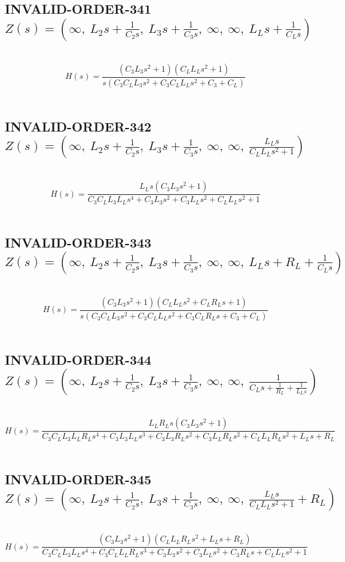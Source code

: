 \documentclass{article}
\begin{document}
\subsection{INVALID-ORDER-341 $Z(s) = \left( \infty, \  L_{2} s + \frac{1}{C_{2} s}, \  L_{3} s + \frac{1}{C_{3} s}, \  \infty, \  \infty, \  L_{L} s + \frac{1}{C_{L} s}\right)$ } \ 
\textbf{\[H(s) = \frac{\left(C_{3} L_{3} s^{2} + 1\right) \left(C_{L} L_{L} s^{2} + 1\right)}{s \left(C_{3} C_{L} L_{3} s^{2} + C_{3} C_{L} L_{L} s^{2} + C_{3} + C_{L}\right)}\] } \ 
\subsection{INVALID-ORDER-342 $Z(s) = \left( \infty, \  L_{2} s + \frac{1}{C_{2} s}, \  L_{3} s + \frac{1}{C_{3} s}, \  \infty, \  \infty, \  \frac{L_{L} s}{C_{L} L_{L} s^{2} + 1}\right)$ } \ 
\textbf{\[H(s) = \frac{L_{L} s \left(C_{3} L_{3} s^{2} + 1\right)}{C_{3} C_{L} L_{3} L_{L} s^{4} + C_{3} L_{3} s^{2} + C_{3} L_{L} s^{2} + C_{L} L_{L} s^{2} + 1}\] } \ 
\subsection{INVALID-ORDER-343 $Z(s) = \left( \infty, \  L_{2} s + \frac{1}{C_{2} s}, \  L_{3} s + \frac{1}{C_{3} s}, \  \infty, \  \infty, \  L_{L} s + R_{L} + \frac{1}{C_{L} s}\right)$ } \ 
\textbf{\[H(s) = \frac{\left(C_{3} L_{3} s^{2} + 1\right) \left(C_{L} L_{L} s^{2} + C_{L} R_{L} s + 1\right)}{s \left(C_{3} C_{L} L_{3} s^{2} + C_{3} C_{L} L_{L} s^{2} + C_{3} C_{L} R_{L} s + C_{3} + C_{L}\right)}\] } \ 
\subsection{INVALID-ORDER-344 $Z(s) = \left( \infty, \  L_{2} s + \frac{1}{C_{2} s}, \  L_{3} s + \frac{1}{C_{3} s}, \  \infty, \  \infty, \  \frac{1}{C_{L} s + \frac{1}{R_{L}} + \frac{1}{L_{L} s}}\right)$ } \ 
\textbf{\[H(s) = \frac{L_{L} R_{L} s \left(C_{3} L_{3} s^{2} + 1\right)}{C_{3} C_{L} L_{3} L_{L} R_{L} s^{4} + C_{3} L_{3} L_{L} s^{3} + C_{3} L_{3} R_{L} s^{2} + C_{3} L_{L} R_{L} s^{2} + C_{L} L_{L} R_{L} s^{2} + L_{L} s + R_{L}}\] } \ 
\subsection{INVALID-ORDER-345 $Z(s) = \left( \infty, \  L_{2} s + \frac{1}{C_{2} s}, \  L_{3} s + \frac{1}{C_{3} s}, \  \infty, \  \infty, \  \frac{L_{L} s}{C_{L} L_{L} s^{2} + 1} + R_{L}\right)$ } \ 
\textbf{\[H(s) = \frac{\left(C_{3} L_{3} s^{2} + 1\right) \left(C_{L} L_{L} R_{L} s^{2} + L_{L} s + R_{L}\right)}{C_{3} C_{L} L_{3} L_{L} s^{4} + C_{3} C_{L} L_{L} R_{L} s^{3} + C_{3} L_{3} s^{2} + C_{3} L_{L} s^{2} + C_{3} R_{L} s + C_{L} L_{L} s^{2} + 1}\] } \ 
\end{document}
